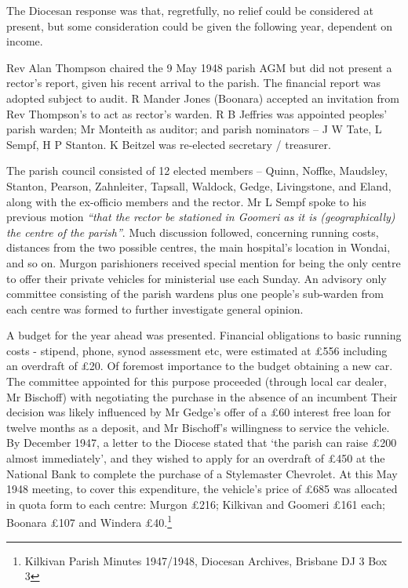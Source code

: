 The Diocesan response was that, regretfully, no relief could be considered at present, but some consideration could be given the following year, dependent on income.



Rev Alan Thompson chaired the 9 May 1948 parish AGM but did not present a rector's report, given his recent arrival to the parish. The financial report was adopted subject to audit. R Mander Jones (Boonara) accepted an invitation from Rev Thompson's to act as rector's warden. R B Jeffries was appointed peoples' parish warden; Mr Monteith as auditor; and parish nominators -- J W Tate, L Sempf, H P Stanton. K Beitzel was re-elected secretary / treasurer.



The parish council consisted of 12 elected members -- Quinn, Noffke, Maudsley, Stanton, Pearson, Zahnleiter, Tapsall, Waldock, Gedge, Livingstone, and Eland, along with the ex-officio members and the rector. Mr L Sempf spoke to his previous motion \emph{``that the rector be stationed in Goomeri as it is (geographically) the centre of the parish''}. Much discussion followed, concerning running costs, distances from the two possible centres, the main hospital's location in Wondai, and so on. Murgon parishioners received special mention for being the only centre to offer their private vehicles for ministerial use each Sunday. An advisory only committee consisting of the parish wardens plus one people's sub-warden from each centre was formed to further investigate general opinion.



A budget for the year ahead was presented. Financial obligations to basic running costs - stipend, phone, synod assessment etc, were estimated at \pounds556 including an overdraft of \pounds20. Of foremost importance to the budget obtaining a new car. The committee appointed for this purpose proceeded (through local car dealer, Mr Bischoff) with negotiating the purchase in the absence of an incumbent Their decision was likely influenced by Mr Gedge's offer of a \pounds60 interest free loan for twelve months as a deposit, and Mr Bischoff's willingness to service the vehicle. By December 1947, a letter to the Diocese stated that `the parish can raise \pounds200 almost immediately', and they wished to apply for an overdraft of \pounds450 at the National Bank to complete the purchase of a Stylemaster Chevrolet. At this May 1948 meeting, to cover this expenditure, the vehicle's price of \pounds685 was allocated in quota form to each centre: Murgon \pounds216; Kilkivan and Goomeri \pounds161 each; Boonara \pounds107 and Windera \pounds40.\footnote{Kilkivan Parish Minutes 1947/1948, Diocesan Archives, Brisbane DJ 3 Box 3}


